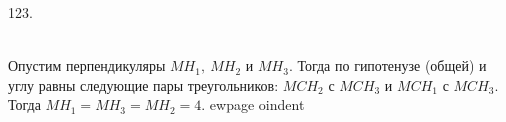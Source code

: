 123. \begin{figure}[ht!]
\end{figure}\\
Опустим перпендикуляры $MH_1,\ MH_2$ и $MH_3.$ Тогда по гипотенузе (общей) и углу равны следующие пары треугольников: $MCH_2$ с $MCH_3$ и $MCH_1$ с $MCH_3.$ Тогда $MH_1=MH_3=MH_2=4.$
ewpage
oindent
